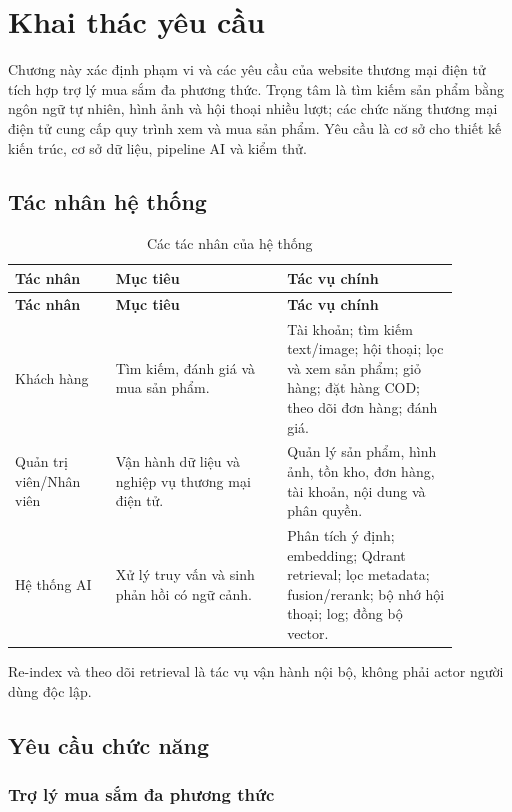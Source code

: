 \section{Khai thác yêu cầu}

Chương này xác định phạm vi và các yêu cầu của website thương mại điện tử tích hợp trợ lý mua sắm đa phương thức. Trọng tâm là tìm kiếm sản phẩm bằng ngôn ngữ tự nhiên, hình ảnh và hội thoại nhiều lượt; các chức năng thương mại điện tử cung cấp quy trình xem và mua sản phẩm. Yêu cầu là cơ sở cho thiết kế kiến trúc, cơ sở dữ liệu, pipeline AI và kiểm thử.

\subsection{Tác nhân hệ thống}

\begin{longtable}{|p{0.20\linewidth}|p{0.34\linewidth}|p{0.34\linewidth}|}
\caption{Các tác nhân của hệ thống}\label{tab:system-actors}\\
\hline
\textbf{Tác nhân} & \textbf{Mục tiêu} & \textbf{Tác vụ chính} \\
\hline
\endfirsthead
\hline
\textbf{Tác nhân} & \textbf{Mục tiêu} & \textbf{Tác vụ chính} \\
\hline
\endhead
Khách hàng & Tìm kiếm, đánh giá và mua sản phẩm. & Tài khoản; tìm kiếm text/image; hội thoại; lọc và xem sản phẩm; giỏ hàng; đặt hàng COD; theo dõi đơn hàng; đánh giá. \\
\hline
Quản trị viên/Nhân viên & Vận hành dữ liệu và nghiệp vụ thương mại điện tử. & Quản lý sản phẩm, hình ảnh, tồn kho, đơn hàng, tài khoản, nội dung và phân quyền. \\
\hline
Hệ thống AI & Xử lý truy vấn và sinh phản hồi có ngữ cảnh. & Phân tích ý định; embedding; Qdrant retrieval; lọc metadata; fusion/rerank; bộ nhớ hội thoại; log; đồng bộ vector. \\
\hline
\end{longtable}

Re-index và theo dõi retrieval là tác vụ vận hành nội bộ, không phải actor người dùng độc lập.

\subsection{Yêu cầu chức năng}

\subsubsection{Trợ lý mua sắm đa phương thức}

